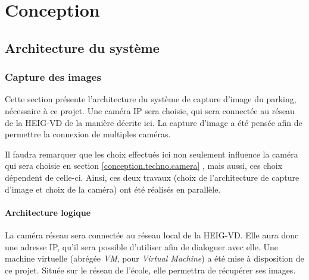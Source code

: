 \chapter{Conception}


\section{Architecture du système}\label{conception.architecture}


\subsection{Capture des images}
Cette section présente l'architecture du système de capture d'image du parking, nécessaire à ce projet. Une caméra IP sera choisie, qui sera connectée au réseau de la HEIG-VD de la manière décrite ici. La capture d'image a été pensée afin de permettre la connexion de multiples caméras.

Il faudra remarquer que les choix effectués ici non seulement influence la caméra qui sera choisie en section \ref{conception.techno.camera} , mais aussi, ces choix dépendent de celle-ci. Ainsi, ces deux travaux (choix de l'architecture de capture d'image et choix de la caméra) ont été réalisés en parallèle.

\subsubsection{Architecture logique}\label{conception.architecture.capture.logique}


La caméra réseau sera connectée au réseau local de la HEIG-VD. Elle aura donc une adresse IP, qu'il sera possible d'utiliser afin de dialoguer avec elle. Une machine virtuelle (abrégée \textit{VM}, pour \textit{Virtual Machine}) a été mise à disposition de ce projet. Située sur le réseau de l'école, elle permettra de récupérer ses images.

